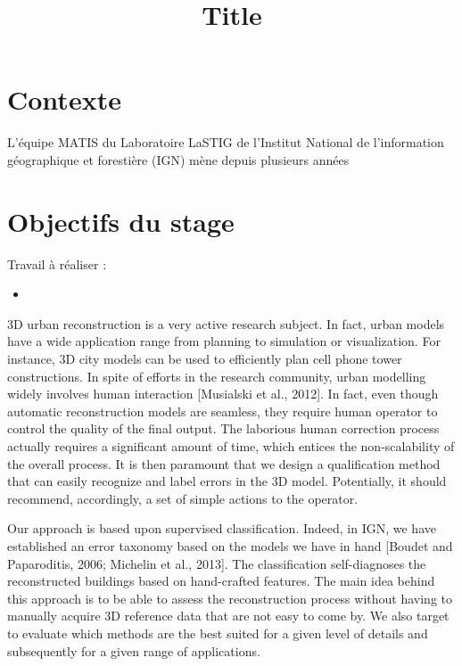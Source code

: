\documentclass[a4paper,11pt]{article}
\title{Title}
\date{}
\begin{document}
    \maketitle

    \section*{Contexte}
    \noindent
    \par
    L'équipe MATIS du Laboratoire LaSTIG de l'Institut National de l'information géographique et forestière (IGN) mène depuis plusieurs années

    \section*{Objectifs du stage}


    Travail à réaliser :
    \begin{itemize}
    \item
    \end{itemize}

    3D urban reconstruction is a very active research subject. In fact, urban models have a wide application range from planning to simulation or visualization. For instance, 3D city models can be used to efficiently plan cell phone tower constructions. In spite of efforts in the research community, urban modelling widely involves human interaction [Musialski et al., 2012]. In fact, even though automatic reconstruction models are seamless, they require human operator to control the quality of the final output. The laborious human correction process actually requires a significant amount of time, which entices the non-scalability of the overall process. It is then paramount that we design a qualification method that can easily recognize and label errors in the 3D model. Potentially, it should recommend, accordingly, a set of simple actions to the operator.

Our approach is based upon supervised classification. Indeed, in IGN, we have established an error taxonomy based on the models we have in hand [Boudet and Paparoditis, 2006; Michelin et al., 2013]. The classification self-diagnoses the reconstructed buildings based on hand-crafted features. The main idea behind this approach is to be able to assess the reconstruction process without having to manually acquire 3D reference data that are not easy to come by. We also target to evaluate which methods are the best suited for a given level of details and subsequently for a given range of applications.
\end{document}
